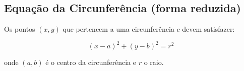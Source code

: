 \subsection{Equação da Circunferência (forma reduzida)}

Os pontos $(x,y)$ que pertencem a uma circunferência $c$ devem satisfazer:

\[
(x-a)^2 + (y-b)^2 = r^2
\]

onde $(a,b)$ é o centro da circunferência e $r$ o raio.
